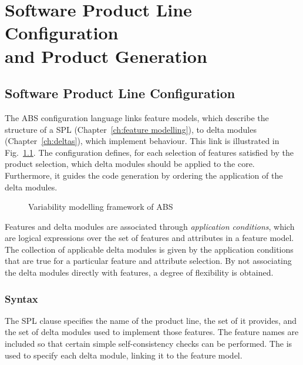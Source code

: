 \chapter{Software Product Line Configuration \\and Product Generation}
\label{ch:spl configuration}

\section{Software Product Line Configuration}
\label{sec:spl configuration}

The ABS configuration language links feature models, which describe the
structure of a SPL (Chapter~\ref{ch:feature modelling}), to delta modules
(Chapter~\ref{ch:deltas}), which implement behaviour. This link is illustrated
in Fig.~\ref{fig:variability overview}. The configuration defines, for each
selection of features satisfied by the product selection, which delta modules should
be applied to the core. Furthermore, it guides the code generation by ordering
the application of the delta modules.

\begin{figure}
    \centering
    
    \caption{Variability modelling framework of ABS
    }
    \label{fig:variability overview}
\end{figure}

Features and delta modules are associated through \emph{application conditions},
which are logical expressions over the set of features and attributes in a
feature model. The collection of applicable delta modules is given by the
application conditions that are true for a particular feature and attribute
selection. By not associating the delta modules directly with features, a degree
of flexibility is obtained.

\subsection{Syntax}
\label{spl configuration syntax}

The SPL  clause specifies the name of the product
line, the set of  it provides, and the set of delta modules used to
implement those features. The feature names are included so that certain simple
self-consistency checks can be performed. The  is used to
specify each delta module, linking it to the feature model.

